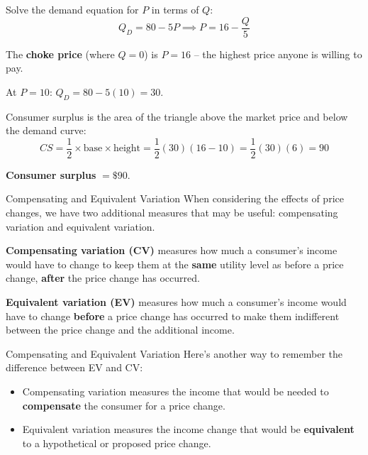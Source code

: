 \documentclass{beamer}
\begin{document}
\begin{frame}

  \bigskip
  Solve the demand equation for $P$ in terms of $Q$:
  $$
    Q_D = 80 - 5P \implies P = 16 - \frac{Q}{5}
  $$

 
  The \textbf{choke price} (where $Q=0$) is $P=16$ -- the highest price anyone is willing to pay.


  At $P=10$: $Q_D = 80 - 5(10) = 30$.

  \bigskip
  Consumer surplus is the area of the triangle above the market price and below the demand curve:
  $$
    CS = \frac{1}{2} \times \text{base} \times \text{height} = \frac{1}{2}(30)(16-10) = \frac{1}{2}(30)(6) = 90
  $$


  \textbf{Consumer surplus} $= \$90$.
\end{frame}

\begin{frame}{Compensating and Equivalent Variation}
  When considering the effects of price changes, we have two additional measures that may be useful: compensating variation and equivalent variation.

  \bigskip
  \textbf{Compensating variation (CV)} measures how much a consumer's income would have to change to keep them at the \textbf{same} utility level as before a price change, \textbf{after} the price change has occurred.
  
  \bigskip
  \textbf{Equivalent variation (EV)} measures how much a consumer's income would have to change \textbf{before} a price change has occurred to make them indifferent between the price change and the additional income.
\end{frame}

\begin{frame}{Compensating and Equivalent Variation}
  Here's another way to remember the difference between EV and CV:
  
  \bigskip
  \begin{itemize}
    \item Compensating variation measures the income that would be needed to \textbf{compensate} the consumer for a price change.

    \item Equivalent variation measures the income change that would be \textbf{equivalent} to a hypothetical or proposed price change.
  \end{itemize}
\end{frame}
\end{document}
